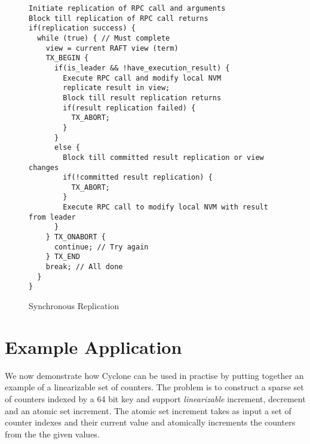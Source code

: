 \documentclass[twocolumn]{article}
\begin{document}
\begin{figure*}
\centering
\begin{minipage}{0.7\textwidth}  
{ \scriptsize
\begin{verbatim}
Initiate replication of RPC call and arguments
Block till replication of RPC call returns
if(replication success) {  
  while (true) { // Must complete 
    view = current RAFT view (term)
    TX_BEGIN {
      if(is_leader && !have_execution_result) {
        Execute RPC call and modify local NVM
        replicate result in view;
        Block till result replication returns
        if(result replication failed) {
          TX_ABORT;
        }
      }
      else {
        Block till committed result replication or view changes
        if(!committed result replication) {
          TX_ABORT;
        }
        Execute RPC call to modify local NVM with result from leader
      }
    } TX_ONABORT {
      continue; // Try again
    } TX_END
    break; // All done
  }
}
\end{verbatim}
}
\end{minipage}
\caption{Synchronous Replication}
\label{fig:sync_rep}
\end{figure*}


\section{Example Application}
\label{sec:examples}
We now demonstrate how Cyclone can be used in practise by putting together an
example of a linearizable set of counters. The problem is to construct a sparse
set of counters indexed by a 64 bit key and support \emph{linearizable}
increment, decrement and an atomic set increment. The atomic set increment takes
as input a set of counter indexes and their current value and atomically
increments the counters from the the given values. 
\end{document}
